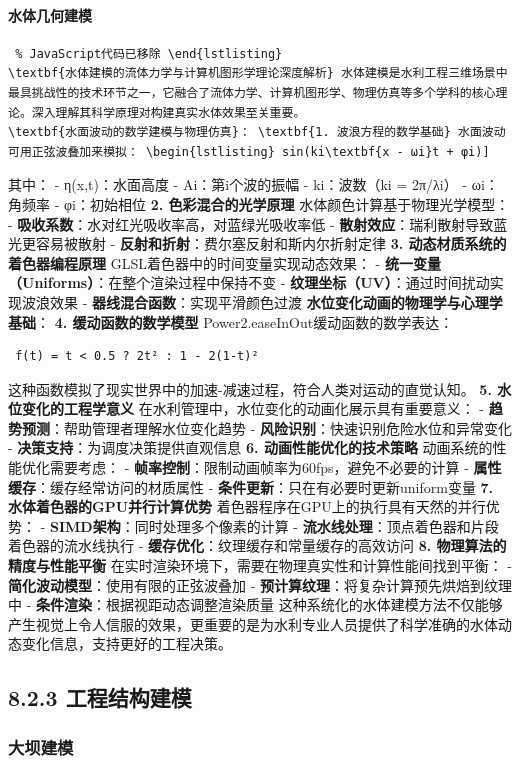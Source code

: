 \paragraph{水体几何建模}\label{ux6c34ux4f53ux51e0ux4f55ux5efaux6a21} \begin{lstlisting} % JavaScript代码已移除 \end{lstlisting}
\textbf{水体建模的流体力学与计算机图形学理论深度解析} 水体建模是水利工程三维场景中最具挑战性的技术环节之一，它融合了流体力学、计算机图形学、物理仿真等多个学科的核心理论。深入理解其科学原理对构建真实水体效果至关重要。
\textbf{水面波动的数学建模与物理仿真}： \textbf{1. 波浪方程的数学基础} 水面波动可用正弦波叠加来模拟： \begin{lstlisting} sin(ki\textbf{x - ωi}t + φi)]
\end{lstlisting} 其中： - η(x,t)：水面高度 - Ai：第i个波的振幅 - ki：波数（ki = 2π/λi） - ωi：角频率 - φi：初始相位 \textbf{2. 色彩混合的光学原理}
水体颜色计算基于物理光学模型： - \textbf{吸收系数}：水对红光吸收率高，对蓝绿光吸收率低 - \textbf{散射效应}：瑞利散射导致蓝光更容易被散射 - \textbf{反射和折射}：费尔塞反射和斯内尔折射定律
\textbf{3. 动态材质系统的着色器编程原理} GLSL着色器中的时间变量实现动态效果： - \textbf{统一变量（Uniforms）}：在整个渲染过程中保持不变 - \textbf{纹理坐标（UV）}：通过时间扰动实现波浪效果
- \textbf{器线混合函数}：实现平滑颜色过渡 \textbf{水位变化动画的物理学与心理学基础}： \textbf{4. 缓动函数的数学模型} Power2.easeInOut缓动函数的数学表达：
\begin{lstlisting} f(t) = t < 0.5 ? 2t² : 1 - 2(1-t)² \end{lstlisting} 这种函数模拟了现实世界中的加速-减速过程，符合人类对运动的直觉认知。 \textbf{5.
水位变化的工程学意义} 在水利管理中，水位变化的动画化展示具有重要意义： - \textbf{趋势预测}：帮助管理者理解水位变化趋势 - \textbf{风险识别}：快速识别危险水位和异常变化 -
\textbf{决策支持}：为调度决策提供直观信息 \textbf{6. 动画性能优化的技术策略} 动画系统的性能优化需要考虑： - \textbf{帧率控制}：限制动画帧率为60fps，避免不必要的计算 -
\textbf{属性缓存}：缓存经常访问的材质属性 - \textbf{条件更新}：只在有必要时更新uniform变量 \textbf{7. 水体着色器的GPU并行计算优势} 着色器程序在GPU上的执行具有天然的并行优势： -
\textbf{SIMD架构}：同时处理多个像素的计算 - \textbf{流水线处理}：顶点着色器和片段着色器的流水线执行 - \textbf{缓存优化}：纹理缓存和常量缓存的高效访问 \textbf{8. 物理算法的精度与性能平衡}
在实时渲染环境下，需要在物理真实性和计算性能间找到平衡： - \textbf{简化波动模型}：使用有限的正弦波叠加 - \textbf{预计算纹理}：将复杂计算预先烘焙到纹理中 - \textbf{条件渲染}：根据视距动态调整渲染质量
这种系统化的水体建模方法不仅能够产生视觉上令人信服的效果，更重要的是为水利专业人员提供了科学准确的水体动态变化信息，支持更好的工程决策。 \subsection{8.2.3
工程结构建模}\label{ux5de5ux7a0bux7ed3ux6784ux5efaux6a21} \subsubsection{大坝建模}\label{ux5927ux575dux5efaux6a21}
